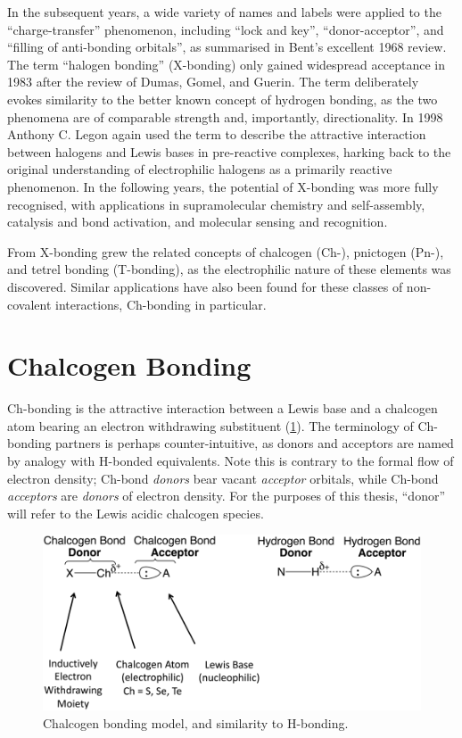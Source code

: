 \begin{refsection}
In the subsequent years, a wide variety of names and labels were applied to the ``charge-transfer'' phenomenon, including ``lock and key'', ``donor-acceptor'', and ``filling of anti-bonding orbitals'', as summarised in Bent's excellent 1968 review\autocite{Bent1968}.
The term ``halogen bonding'' (X-bonding) only gained widespread acceptance in 1983 after the review of Dumas, Gomel, and Guerin.\autocite{Dumas1983}
The term deliberately evokes similarity to the better known concept of hydrogen bonding, as the two phenomena are of comparable strength and, importantly, directionality.
In 1998 Anthony C. Legon again used the term to describe the attractive interaction between halogens and Lewis bases in pre-reactive complexes, harking back to the original understanding of electrophilic halogens as a primarily reactive phenomenon.\autocite{Legon1998,Legon1999}
In the following years, the potential of X-bonding was more fully recognised, with applications in supramolecular chemistry and self-assembly\autocite{Corradi2000,Metrangolo2008,Priimagi2013}, catalysis and bond activation\autocite{Walter2011,Soloshonok2017,Takagi2017}, and molecular sensing and recognition\autocite{Cornes2017,VargasJentzsch2013,Borissov2017}.

From X-bonding grew the related concepts of chalcogen (Ch-), pnictogen (Pn-), and tetrel bonding (T-bonding), as the electrophilic nature of these elements was discovered.\autocite{Murray2007}
Similar applications have also been found for these classes of non-covalent interactions, Ch-bonding in particular.\autocite{Fanfrlik2014,Garrett2016,Ho2016,Wonner2017,Mitchell2017,Benz2017,Biot2018,Ho2017}

\section{Chalcogen Bonding}
Ch-bonding is the attractive interaction between a Lewis base and a chalcogen atom bearing an electron withdrawing substituent (\cref{fig:ch-bonding-intro}).
The terminology of Ch-bonding partners is perhaps counter-intuitive, as donors and acceptors are named by analogy with H-bonded equivalents.
Note this is contrary to the formal flow of electron density; Ch-bond \emph{donors} bear vacant \emph{acceptor} orbitals, while Ch-bond \emph{acceptors} are \emph{donors} of electron density.
For the purposes of this thesis, ``donor'' will refer to the Lewis acidic chalcogen species.

\begin{figure}
    \centering
    \includegraphics[width=0.8\linewidth]{Figures/ch-bonding.pdf}
    \caption{Chalcogen bonding model, and similarity to H-bonding.}\label{fig:ch-bonding-intro}
\end{figure}


\end{refsection}
